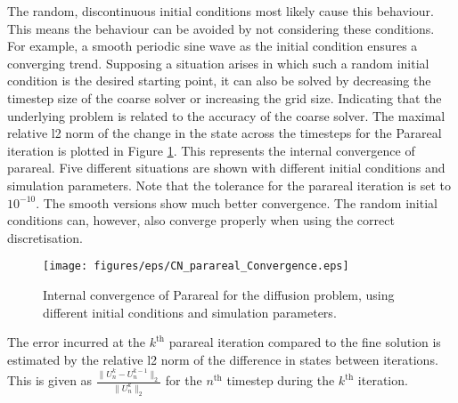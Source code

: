 The random, discontinuous initial conditions  most likely cause this behaviour. This means the behaviour can be avoided by not considering these conditions. For example, a smooth periodic sine wave as the initial condition ensures a converging trend. Supposing a situation arises in which such a random initial condition is the desired starting point, it can also be solved by decreasing the timestep size of the coarse solver or increasing the grid size. Indicating that the underlying problem is related to the accuracy of the coarse solver. The maximal relative l2 norm of the change in the state across the timesteps for the Parareal iteration is plotted in Figure \ref{fig: CN-parareal-convergence}. This represents the internal convergence of parareal. Five different situations are shown with different initial conditions and simulation parameters. Note that the tolerance for the parareal iteration is set to $10^{-10}$. The smooth versions show much better convergence. The random initial conditions can, however, also converge properly when using the correct discretisation. 
\begin{figure}[h]
    \centering
    \texttt{[image: figures/eps/CN\_parareal\_Convergence.eps]}
    \caption{Internal convergence of Parareal for the diffusion problem, using different initial conditions and simulation parameters. }
    \label{fig: CN-parareal-convergence}
\end{figure}
\newline 
The error incurred at the $k^\mathrm{th}$  parareal iteration compared to the fine solution is estimated by the relative l2 norm of the difference in states between iterations. This is given as $\frac{\|U^k_n - U^{k-1}_n\|_2}{\|U^k_n\|_2}$ for the $n^\mathrm{th}$ timestep during the $k^\mathrm{th}$ iteration.
